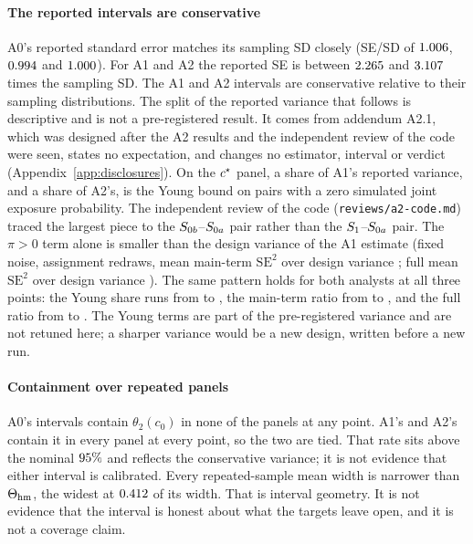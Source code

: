 \paragraph{The reported intervals are conservative} A0's reported standard error
matches its sampling SD closely (SE/SD of $1.006$,
$0.994$ and $1.000$). For A1 and A2 the
reported SE is between $2.265$ and $3.107$
times the sampling SD. The A1 and A2 intervals are conservative relative to their
sampling distributions. The split of the reported variance that follows is
descriptive and is not a pre-registered result. It comes from addendum A2.1, which
was designed after the A2 results and the independent review of the code were
seen, states no expectation, and changes no estimator, interval or verdict
(Appendix~\ref{app:disclosures}). On the $c^\star$ panel, a share
\YoungShareAOneStar{} of A1's reported variance, and a share
\YoungShareATwoStar{} of A2's, is the Young bound on pairs with a zero
simulated joint exposure probability. The independent review of the code
(\texttt{reviews/a2-code.md}) traced the largest piece to the $S_{0b}$--$S_{0a}$ pair
rather than the $S_{1}$--$S_{0a}$ pair. The $\pi>0$ term alone is smaller than the
design variance of the A1 estimate (fixed noise, \DesignRedrawsAOneStar{}
assignment redraws, mean main-term $\mathrm{SE}^2$ over design variance
\DesignMainTermRatioAOneStar; full mean $\mathrm{SE}^2$ over design variance
\DesignFullRatioAOneStar). The same pattern holds for both analysts at all three
points: the Young share runs from \YoungShareATwoMinI{} to \YoungShareAOneMedI,
the main-term ratio from \DesignMainTermRatioATwoMinI{} to
\DesignMainTermRatioAOneMinI, and the full ratio from \DesignFullRatioATwoMinI{}
to \DesignFullRatioAOneMedI. The Young terms are part of the pre-registered
variance and are not retuned here; a sharper variance would be a new design,
written before a new run.

\paragraph{Containment over repeated panels} A0's intervals contain
$\theta_2(c_0)$ in none of the panels at any point. A1's and A2's contain it in
every panel at every point, so the two are tied. That rate sits above the nominal
$95\%$ and reflects the conservative variance; it is not evidence that
either interval is calibrated. Every repeated-sample mean width is narrower than
$\Theta_{\mathrm{hm}}$, the widest at $0.412$ of its width. That is
interval geometry. It is not evidence that the interval is honest about what the
targets leave open, and it is not a coverage claim.

